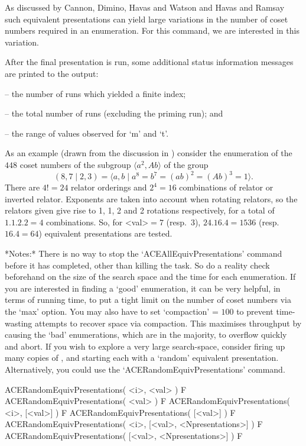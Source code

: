 As discussed by Cannon, Dimino, Havas  and  Watson  \cite{CDHW73}  and
Havas and Ramsay \cite{HR99b} such equivalent presentations can  yield
large variations in  the  number  of  coset  numbers  required  in  an
enumeration. For this command, we are interested in this variation.

After  the  final  presentation  is  run,   some   additional   status
information messages are printed to the {\ACE} output:

\beginlist
\item{--}  the number of runs which yielded a finite index; 
\item{--}  the total number of runs (excluding the priming run); and 
\item{--}  the range of values observed for `m' and `t'.
\endlist

As an example (drawn from the discussion in \cite{HR99a}) consider the
enumeration   of   the   $448$   coset   numbers   of   the   subgroup
$\langle  a^2,Ab \rangle$ of the group
$$ (8,7 \mid 2,3) 
    = \langle a,b \mid a^8 = b^7 = (ab)^2 = (Ab)^3 = 1 \rangle. $$
There are $4!=24$  relator  orderings  and  $2^4=16$  combinations  of
relator or inverted relator. Exponents are  taken  into  account  when
rotating relators, so the relators given give rise to 1, 1,  2  and  2
rotations respectively, for a total of $1.1.2.2=4$  combinations.  So,
for  <val>${} = 7$   (resp.~$3$),   $24.16.4=1536$   (resp.~$16.4=64$)
equivalent presentations are tested.

*Notes:*
There is no way to stop the `ACEAllEquivPresentations' command  before
it has completed, other than killing the task. So do a  reality  check
beforehand on the size of the search  space  and  the  time  for  each
enumeration.  If  you  are  interested   in   finding   a   \lq{}good'
enumeration, it can be very helpful, in terms of running time, to  put
a tight limit on the number of coset numbers via the `max' option. You
may also have to set `compaction'  =  $100$  to  prevent  time-wasting
attempts to recover space via compaction. This maximises throughput by
causing the \lq{}bad' enumerations, which  are  in  the  majority,  to
overflow quickly and abort. If  you  wish  to  explore  a  very  large
search-space, consider firing up many copies of {\ACE},  and  starting
each with a \lq{}random' equivalent presentation.  Alternatively,  you
could use the `ACERandomEquivPresentations' command.


\>ACERandomEquivPresentations( <i>, <val> ) F
\>ACERandomEquivPresentations( <val> ) F
\>ACERandomEquivPresentations( <i>, [<val>] ) F
\>ACERandomEquivPresentations( [<val>] ) F
\>ACERandomEquivPresentations( <i>, [<val>, <Npresentations>] ) F
\>ACERandomEquivPresentations( [<val>, <Npresentations>] ) F


